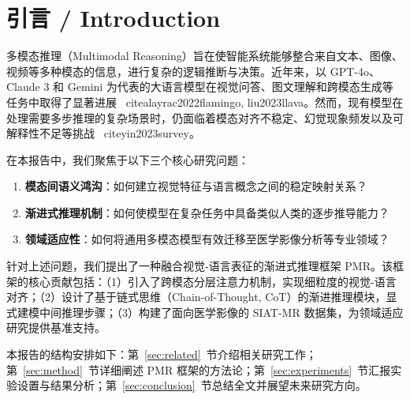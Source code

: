 \section{引言 / Introduction}

多模态推理（Multimodal Reasoning）旨在使智能系统能够整合来自文本、图像、视频等多种模态的信息，进行复杂的逻辑推断与决策。近年来，以 GPT-4o、Claude 3 和 Gemini 为代表的大语言模型在视觉问答、图文理解和跨模态生成等任务中取得了显著进展~
cite{alayrac2022flamingo, liu2023llava}。然而，现有模型在处理需要多步推理的复杂场景时，仍面临着模态对齐不稳定、幻觉现象频发以及可解释性不足等挑战~
cite{yin2023survey}。

在本报告中，我们聚焦于以下三个核心研究问题：
\begin{enumerate}
  \item \textbf{模态间语义鸿沟}：如何建立视觉特征与语言概念之间的稳定映射关系？
  \item \textbf{渐进式推理机制}：如何使模型在复杂任务中具备类似人类的逐步推导能力？
  \item \textbf{领域适应性}：如何将通用多模态模型有效迁移至医学影像分析等专业领域？
\end{enumerate}

针对上述问题，我们提出了一种融合视觉-语言表征的渐进式推理框架 PMR。该框架的核心贡献包括：（1）引入了跨模态分层注意力机制，实现细粒度的视觉-语言对齐；（2）设计了基于链式思维（Chain-of-Thought, CoT）的渐进推理模块，显式建模中间推理步骤；（3）构建了面向医学影像的 SIAT-MR 数据集，为领域适应研究提供基准支持。

本报告的结构安排如下：第~\ref{sec:related}~节介绍相关研究工作；第~\ref{sec:method}~节详细阐述 PMR 框架的方法论；第~\ref{sec:experiments}~节汇报实验设置与结果分析；第~\ref{sec:conclusion}~节总结全文并展望未来研究方向。
